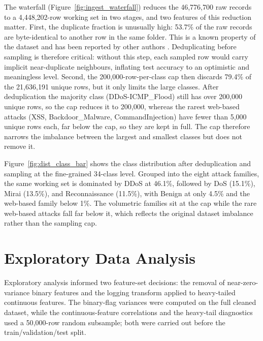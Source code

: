 \par The waterfall (Figure~\ref{fig:ingest_waterfall}) reduces the 46{,}776{,}700 raw records to a 4{,}448{,}202-row working set in two stages, and two features of this reduction matter. First, the duplicate fraction is unusually high: 53.7\% of the raw records are byte-identical to another row in the same folder. This is a known property of the dataset and has been reported by other authors \cite{CICIoT2023}. Deduplicating before sampling is therefore critical: without this step, each sampled row would carry implicit near-duplicate neighbours, inflating test accuracy to an optimistic and meaningless level. Second, the 200{,}000-row-per-class cap then discards 79.4\% of the 21{,}636{,}191 unique rows, but it only limits the large classes. After deduplication the majority class (DDoS-ICMP\_Flood) still has over 200{,}000 unique rows, so the cap reduces it to 200{,}000, whereas the rarest web-based attacks (XSS, Backdoor\_Malware, CommandInjection) have fewer than 5{,}000 unique rows each, far below the cap, so they are kept in full. The cap therefore narrows the imbalance between the largest and smallest classes but does not remove it.

\par Figure~\ref{fig:dist_class_bar} shows the class distribution after deduplication and sampling at the fine-grained 34-class level. Grouped into the eight attack families, the same working set is dominated by DDoS at 46.1\%, followed by DoS (15.1\%), Mirai (13.5\%), and Reconnaissance (11.5\%), with Benign at only 4.5\% and the web-based family below 1\%. The volumetric families sit at the cap while the rare web-based attacks fall far below it, which reflects the original dataset imbalance rather than the sampling cap.

\section{Exploratory Data Analysis}
\label{sec:eda_results}

\par Exploratory analysis informed two feature-set decisions: the removal of near-zero-variance binary features and the logging transform applied to heavy-tailed continuous features. The binary-flag variances were computed on the full cleaned dataset, while the continuous-feature correlations and the heavy-tail diagnostics used a 50{,}000-row random subsample; both were carried out before the train/validation/test split.

